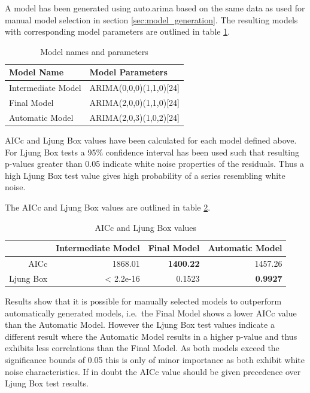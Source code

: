 A model has been generated using auto.arima based on the same data as used for manual model selection in section \ref{sec:model_generation}. 
The resulting models with corresponding model parameters are outlined in table \ref{tab:model_names_and_parameters}. 

\begin{table}[ht]
\centering
\begin{tabular}{l|l}
 \textbf{Model Name} & \textbf{Model Parameters} \\ 
  \hline
	Intermediate Model	& ARIMA(0,0,0)(1,1,0)[24] \\ 
	Final Model 				& ARIMA(2,0,0)(1,1,0)[24] \\ 
	Automatic Model 		& ARIMA(2,0,3)(1,0,2)[24] \\ 
\end{tabular}
\caption{Model names and parameters}
\label{tab:model_names_and_parameters}
\end{table}

AICc and Ljung Box values have been calculated for each model defined above. For Ljung Box tests a 95\% confidence interval has been used
such that resulting p-values greater than 0.05 indicate white noise properties of the residuals. Thus a high Ljung Box test value gives 
high probability of a series resembling white noise. 

The AICc and Ljung Box values are outlined in table \ref{tab:model_aicc_and_ljung_box_values}. 

\begin{table}[ht]
\centering
\begin{tabular}{r|r|r|r}
 & Intermediate Model & Final Model & Automatic Model \\ 
  \hline
	AICc 			& 1868.01 & \textbf{1400.22} & 1457.26 \\ 
  Ljung Box & < 2.2e-16 & 0.1523 & \textbf{0.9927} \\ 
\end{tabular}
\caption{AICc and Ljung Box values}
\label{tab:model_aicc_and_ljung_box_values}
\end{table}

Results show that it is possible for manually selected models to outperform automatically generated models, i.e.~the Final Model shows a lower AICc value than the Automatic Model. However the Ljung Box test values indicate a different result where the Automatic Model results in a higher p-value and thus exhibits less correlations than the Final Model. As both models exceed the significance bounds of 0.05 this is only of minor importance as both exhibit white noise characteristics. If in doubt the AICc value should be given precedence over Ljung Box test results. 


